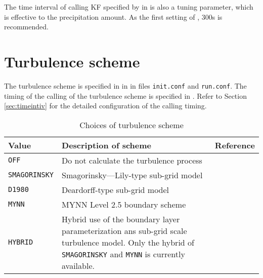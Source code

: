 The time interval of calling KF specified by  in  is also a tuning parameter, which is effective to the precipitation amount. As the first setting of , 300s is recommended.



\section{Turbulence scheme} \label{sec:basic_usel_turbulence}

The turbulence scheme is specified in  in  in files \verb|init.conf| and \verb|run.conf|. The timing of the calling of the turbulence scheme is specified in . Refer to Section \ref{sec:timeintiv} for the detailed configuration of the calling timing.

\begin{table}[h]
\begin{center}
  \caption{Choices of turbulence scheme}
  \label{tab:nml_atm_tb}
  \begin{tabularx}{150mm}{lXX} \hline
    \rowcolor[gray]{0.9}  Value & Description of scheme & Reference\\ \hline
      \verb|OFF|          & Do not calculate the turbulence process &  \\
      \verb|SMAGORINSKY|  & Smagorinsky—Lily-type sub-grid model & \citet{smagorinsky_1963,lilly_1962,Brown_etal_1994,Scotti_1993} \\
      \verb|D1980|        & Deardorff-type sub-grid model & \citet{Deardorff_1980} \\
      \verb|MYNN|         & MYNN Level 2.5 boundary scheme & \citet{my_1982,nakanishi_2004} \\
      \verb|HYBRID|       & Hybrid use of the boundary layer parameterization ans sub-grid scale turbulence model. Only the hybrid of \verb|SMAGORINSKY| and \verb|MYNN| is currently available.\\
    \hline
  \end{tabularx}
\end{center}
\end{table}

